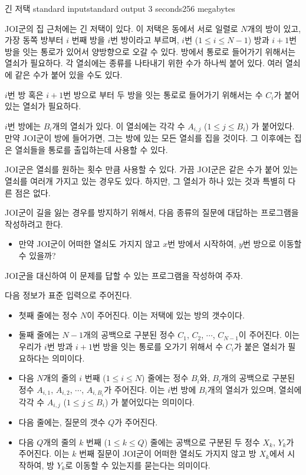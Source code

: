 \begin{problem}{긴 저택}
	{standard input}{standard output}
	{3 seconds}{256 megabytes}{}
	
	JOI군의 집 근처에는 긴 저택이 있다. 이 저택은 동에서 서로 일렬로 $N$개의 방이 있고, 가장 동쪽 방부터 $i$ 번째 방을 $i$번 방이라고 부르며, $i$번 ($1 \le i \le N-1$) 방과 $i+1$번 방을 잇는 통로가 있어서 양방향으로 오갈 수 있다. 방에서 통로로 들어가기 위해서는 열쇠가 필요하다. 각 열쇠에는 종류를 나타내기 위한 수가 하나씩 붙어 있다. 여러 열쇠에 같은 수가 붙어 있을 수도 있다.
	
	$i$번 방 혹은 $i+1$번 방으로 부터 두 방을 잇는 통로로 들어가기 위해서는 수 $C_i$가 붙어 있는 열쇠가 필요하다.
	
	$i$번 방에는 $B_i$개의 열쇠가 있다. 이 열쇠에는 각각 수 $A_{i, j}$ ($1 \le j \le B_i$) 가 붙어있다. 만약 JOI군이 방에 들어가면, 그는 방에 있는 모든 열쇠를 집을 것이다. 그 이후에는 집은 열쇠들을 통로를 출입하는데 사용할 수 있다.
	
	JOI군은 열쇠를 원하는 횟수 만큼 사용할 수 있다. 가끔 JOI군은 같은 수가 붙어 있는 열쇠를 여러개 가지고 있는 경우도 있다. 하지만, 그 열쇠가 하나 있는 것과 특별히 다른 점은 없다.
	
	JOI군이 길을 잃는 경우를 방지하기 위해서, 다음 종류의 질문에 대답하는 프로그램을 작성하려고 한다.
	
	\begin{itemize}
		\item 만약 JOI군이 어떠한 열쇠도 가지지 않고 $x$번 방에서 시작하여, $y$번 방으로 이동할 수 있을까?
	\end{itemize}

	JOI군을 대신하여 이 문제를 답할 수 있는 프로그램을 작성하여 주자.
	
	\InputFile
	
	다음 정보가 표준 입력으로 주어진다.
	
	\begin{itemize}
		\item 첫째 줄에는 정수 $N$이 주어진다. 이는 저택에 있는 방의 갯수이다.
		\item 둘째 줄에는 $N-1$개의 공백으로 구분된 정수 $C_1$, $C_2$, $\cdots$, $C_{N-1}$이 주어진다. 이는 우리가 $i$번 방과 $i+1$번 방을 잇는 통로를 오가기 위해서 수 $C_i$가 붙은 열쇠가 필요하다는 의미이다.
		\item 다음 $N$개의 줄의 $i$ 번째 ($1 \le i \le N$) 줄에는 정수 $B_i$와, $B_i$개의 공백으로 구분된 정수 $A_{i, 1}$, $A_{i, 2}$, $\cdots$, $A_{i, B_i}$가 주어진다. 이는 $i$번 방에 $B_i$개의 열쇠가 있으며, 열쇠에 각각 수 $A_{i, j}$ ($1 \le j \le B_i$) 가 붙어있다는 의미이다.
		\item 다음 줄에는, 질문의 갯수 $Q$가 주어진다.
		\item 다음 $Q$개의 줄의 $k$ 번째 ($1 \le k \le Q$) 줄에는 공백으로 구분된 두 정수 $X_k$, $Y_k$가 주어진다. 이는 $k$ 번째 질문이 JOI군이 어떠한 열쇠도 가지지 않고 방 $X_k$에서 시작하여, 방 $Y_k$로 이동할 수 있는지를 묻는다는 의미이다.
	\end{itemize}
	

\end{problem}

